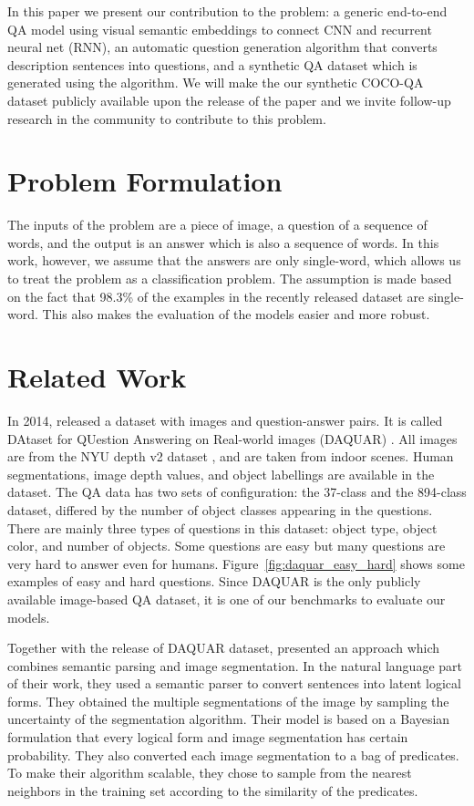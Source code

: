 \documentclass{article}
\renewcommand{\#}[1]{\textbf{#1}}
\begin{document}
In this paper we present our contribution to the problem: a generic end-to-end QA model using visual semantic embeddings to connect CNN and recurrent neural net (RNN), an automatic question generation algorithm that converts description sentences into questions, and a synthetic QA dataset which is generated using the algorithm. We will make the our synthetic COCO-QA dataset publicly available upon the release of the paper and we invite follow-up research in the community to contribute to this problem.

\section{Problem Formulation}
The inputs of the problem are a piece of image, a question of a sequence of words, and the output is an answer which is also a sequence of words. In this work, however, we assume that the answers are only single-word, which allows us to treat the problem as a classification problem. The assumption is made based on the fact that 98.3\% of the examples in the recently released dataset \cite{malinowski14a} are single-word. This also makes the evaluation of the models easier and more robust.

\section{Related Work}
In 2014, \cite{malinowski14a} released a dataset with images and question-answer pairs. It is called DAtaset for QUestion Answering on Real-world images (DAQUAR) . All images are from the NYU depth v2 dataset \cite{silberman12}, and are taken from indoor scenes. Human segmentations, image depth values, and object labellings are available in the dataset. The QA data has two sets of configuration: the 37-class and the 894-class dataset, differed by the number of object classes appearing in the questions. There are mainly three types of questions in this dataset: object type, object color, and number of objects. Some questions are easy but many questions are very hard to answer even for humans. Figure~\ref{fig:daquar_easy_hard} shows some examples of easy and hard questions. Since DAQUAR is the only publicly available image-based QA dataset, it is one of our benchmarks to evaluate our models.

Together with the release of DAQUAR dataset, \cite{malinowski14b} presented an approach which combines semantic parsing and image segmentation. In the natural language part of their work, they used a semantic parser \cite{liang13} to convert sentences into latent logical forms. They obtained the multiple segmentations of the image by sampling the uncertainty of the segmentation algorithm. Their model is based on a Bayesian formulation that every logical form and image segmentation has certain probability. They also converted each image segmentation to a bag of predicates. To make their algorithm scalable, they chose to sample from the nearest neighbors in the training set according to the similarity of the predicates.
\end{document}
